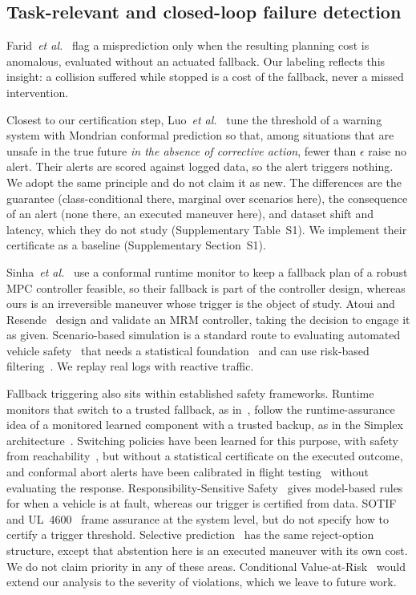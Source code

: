 \documentclass[lettersize,journal]{IEEEtran}
\begin{document}
\subsection{Task-relevant and closed-loop failure detection}
Farid~\emph{et al.}~\cite{taskrelevant2022} flag a misprediction only
when the resulting planning cost is anomalous, evaluated without an actuated
fallback. Our labeling reflects this insight: a collision suffered while
stopped is a cost of the fallback, never a missed intervention.

Closest to our certification step, Luo~\emph{et al.}~\cite{luo2022} tune
the threshold of a warning system with Mondrian conformal prediction so
that, among situations that are unsafe in the true future \emph{in the
absence of corrective action}, fewer than $\epsilon$ raise no alert.
Their alerts are scored against logged data, so the alert triggers nothing.
We adopt the same principle and do not claim it as new. The differences are
the guarantee
(class-conditional there, marginal over scenarios here), the consequence of
an alert (none there, an executed maneuver here), and dataset shift and
latency, which they do not study (Supplementary Table~S1). We implement
their certificate as a baseline (Supplementary Section~S1).

Sinha~\emph{et al.}~\cite{sinha2023} use a conformal runtime monitor to
keep a fallback plan of a robust MPC controller feasible, so their fallback
is part of the controller design, whereas ours is an irreversible maneuver
whose trigger is the object of study. Atoui and
Resende~\cite{atoui2025mrm} design and validate an MRM controller,
taking the decision to engage it as given. Scenario-based simulation is a
standard route to evaluating automated vehicle
safety~\cite{sohrabi2021,xie2025} that needs a statistical
foundation~\cite{zhao2025stat} and can use risk-based
filtering~\cite{puphal2025risk}. We replay real logs with reactive traffic.

Fallback triggering also sits within established safety frameworks.
Runtime monitors that switch to a trusted fallback, as
in~\cite{sinha2023,atoui2025mrm}, follow the runtime-assurance idea of a
monitored learned component with a trusted backup, as in the Simplex
architecture~\cite{sha2001}. Switching policies
have been learned for this purpose, with safety from
reachability~\cite{miller2023rta}, but without a statistical certificate on
the executed outcome, and conformal abort alerts have been calibrated in
flight testing~\cite{feldman2025} without evaluating the response.
Responsibility-Sensitive Safety~\cite{rss2017} gives model-based rules for
when a vehicle is at fault, whereas our trigger is certified from data.
SOTIF~\cite{iso21448} and UL~4600~\cite{ul4600} frame assurance at the
system level, but do not specify how to certify a trigger threshold.
Selective prediction~\cite{geifman2017} has the same reject-option structure,
except that abstention here is an executed maneuver with its own cost. We do
not claim priority in any of these areas. Conditional Value-at-Risk~\cite{cvar2022} would extend our analysis to the severity of violations, which we leave to future work.
\end{document}
